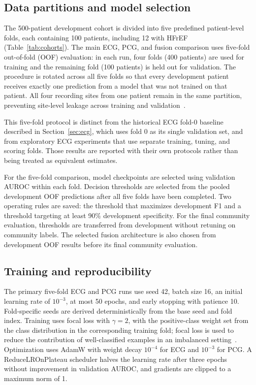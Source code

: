 \documentclass[11pt,a4paper]{article}
\begin{document}
\subsection{Data partitions and model selection}
The 500-patient development cohort is divided into five predefined
patient-level folds, each containing 100 patients, including 12 with HFrEF
(Table~\ref{tab:cohorts}). The main ECG, PCG, and fusion comparison uses
five-fold out-of-fold (OOF) evaluation: in each run, four folds (400 patients)
are used for training and the remaining fold (100 patients) is held out for
validation. The procedure is rotated across all five folds so that every
development patient receives exactly one prediction from a model that was not
trained on that patient. All four recording sites from one patient remain in
the same partition, preventing site-level leakage across training and
validation~\cite{hfrefdataset}.

This five-fold protocol is distinct from the historical ECG fold-0 baseline
described in Section~\ref{sec:ecg}, which uses fold 0 as its single validation
set, and from exploratory ECG experiments that use separate training, tuning,
and scoring folds. Those results are reported with their own protocols rather
than being treated as equivalent estimates.

For the five-fold comparison, model checkpoints are selected using validation
AUROC within each fold. Decision thresholds are selected from the pooled
development OOF predictions after all five folds have been completed. Two
operating rules are saved: the threshold that maximizes development F1 and a
threshold targeting at least 90\% development specificity. For the final
community evaluation, thresholds are transferred from development without
retuning on community labels. The selected fusion architecture is also chosen
from development OOF results before its final community evaluation.

\subsection{Training and reproducibility}

The primary five-fold ECG and PCG runs use seed 42, batch size 16, an initial
learning rate of $10^{-3}$, at most 50 epochs, and early stopping with patience
10. Fold-specific seeds are derived deterministically from the base seed and
fold index. Training uses focal loss with $\gamma=2$, with the positive-class
weight set from the class distribution in the corresponding training fold;
focal loss is used to reduce the contribution of well-classified examples in
an imbalanced setting~\cite{lin2017focal}. Optimization uses AdamW
\cite{loshchilov2019adamw} with weight decay $10^{-4}$ for ECG and
$10^{-3}$ for PCG. A ReduceLROnPlateau scheduler halves the learning rate after
three epochs without improvement in validation AUROC, and gradients are clipped
to a maximum norm of 1.
\end{document}
